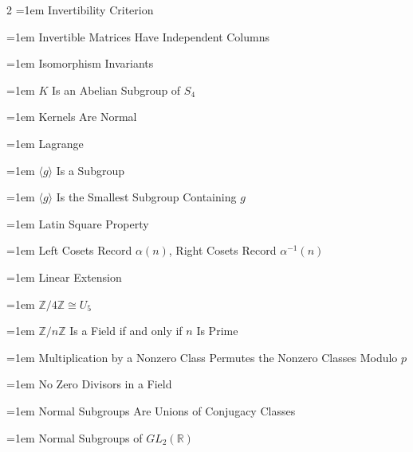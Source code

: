 \documentclass[11pt]{report}
\begin{document}
\begin{multicols}{2}
\noindent\hangindent=1em Invertibility Criterion\dotfill \pageref{prop:invertibility-criterion}\par
\noindent\hangindent=1em Invertible Matrices Have Independent Columns\dotfill \pageref{lem:invertible-iff-columns-independent}\par
\noindent\hangindent=1em Isomorphism Invariants\dotfill \pageref{prop:isomorphism-invariants}\par
\noindent\hangindent=1em $K$ Is an Abelian Subgroup of $S_4$\dotfill \pageref{prop:klein-four-group}\par
\noindent\hangindent=1em Kernels Are Normal\dotfill \pageref{prop:kernels-normal}\par
\noindent\hangindent=1em Lagrange\dotfill \pageref{thm:lagrange}\par
\noindent\hangindent=1em $\langle g \rangle$ Is a Subgroup\dotfill \pageref{prop:gen-g-subgroup}\par
\noindent\hangindent=1em $\langle g \rangle$ Is the Smallest Subgroup Containing $g$\dotfill \pageref{prop:gen-g-smallest-subgroup-containing-g}\par
\noindent\hangindent=1em Latin Square Property\dotfill \pageref{cor:latin-square-property}\par
\noindent\hangindent=1em Left Cosets Record $\alpha(n)$, Right Cosets Record $\alpha^{-1}(n)$\dotfill \pageref{prop:left-cosets-record-alpha-n-right-cosets-record}\par
\noindent\hangindent=1em Linear Extension\dotfill \pageref{thm:linear-extension}\par
\noindent\hangindent=1em $\mathbb{Z}/4\mathbb{Z} \cong U_5$\dotfill \pageref{prop:z-4z-iso-u5}\par
\noindent\hangindent=1em $\mathbb{Z}/n\mathbb{Z}$ Is a Field if and only if $n$ Is Prime\dotfill \pageref{prop:z-nz-field-if-only-if-n-prime}\par
\noindent\hangindent=1em Multiplication by a Nonzero Class Permutes the Nonzero Classes Modulo $p$\dotfill \pageref{prop:multiplication-nonzero-class-permutes-nonzero}\par
\noindent\hangindent=1em No Zero Divisors in a Field\dotfill \pageref{prop:no-zero-divisors-field}\par
\noindent\hangindent=1em Normal Subgroups Are Unions of Conjugacy Classes\dotfill \pageref{prop:normal-subgroups-unions-conjugacy-classes}\par
\noindent\hangindent=1em Normal Subgroups of $GL_2(\mathbb{R})$\dotfill \pageref{prop:normal-subgroups-gl2-r}\par

\end{multicols}
\end{document}
